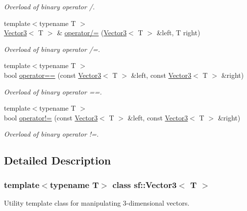 \begin{DoxyCompactItemize}
\begin{DoxyCompactList}\small\item\em Overload of binary operator /. \end{DoxyCompactList}\item 
{\footnotesize template$<$typename T $>$ }\\\mbox{\hyperlink{classsf_1_1_vector3}{Vector3}}$<$ T $>$ \& \mbox{\hyperlink{classsf_1_1_vector3_a8995a700f9dffccc6dddb3696ae17b64}{operator/=}} (\mbox{\hyperlink{classsf_1_1_vector3}{Vector3}}$<$ T $>$ \&left, T right)
\begin{DoxyCompactList}\small\item\em Overload of binary operator /=. \end{DoxyCompactList}\item 
{\footnotesize template$<$typename T $>$ }\\bool \mbox{\hyperlink{classsf_1_1_vector3_a388d72db973306a35ba467016b3dee30}{operator==}} (const \mbox{\hyperlink{classsf_1_1_vector3}{Vector3}}$<$ T $>$ \&left, const \mbox{\hyperlink{classsf_1_1_vector3}{Vector3}}$<$ T $>$ \&right)
\begin{DoxyCompactList}\small\item\em Overload of binary operator ==. \end{DoxyCompactList}\item 
{\footnotesize template$<$typename T $>$ }\\bool \mbox{\hyperlink{classsf_1_1_vector3_a608500d1ad3b78082cb5bb4356742bd4}{operator!=}} (const \mbox{\hyperlink{classsf_1_1_vector3}{Vector3}}$<$ T $>$ \&left, const \mbox{\hyperlink{classsf_1_1_vector3}{Vector3}}$<$ T $>$ \&right)
\begin{DoxyCompactList}\small\item\em Overload of binary operator !=. \end{DoxyCompactList}\end{DoxyCompactItemize}


\subsection{Detailed Description}
\subsubsection*{template$<$typename T$>$\newline
class sf\+::\+Vector3$<$ T $>$}

Utility template class for manipulating 3-\/dimensional vectors. 

